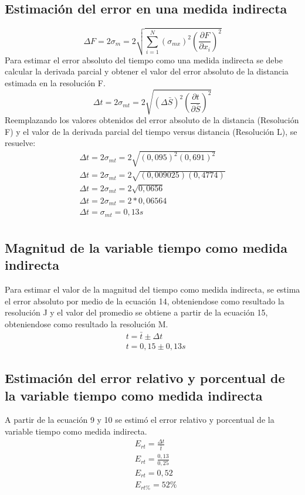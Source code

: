 \documentclass[runningheads]{llncs}
\begin{document}
    \subsection{Estimación del error en una medida indirecta}
    \begin{equation}
        \Delta F=2\sigma_{m}=2{\sqrt{{\displaystyle\sum_{i=1}^{N}(\sigma_{mx})^{2} (\frac{\partial F}{\partial x_{i}})^{2}}}}
    \end{equation}
    Para estimar el error absoluto del tiempo como una medida indirecta se debe calcular la derivada parcial y obtener el valor del error absoluto de la distancia estimada en la resolución F.
    \begin{equation}
        \Delta t=2\sigma_{mt}=2{\sqrt{(\Delta \bar{S})^{2} (\frac{\partial t}{\partial \bar{S}})^{2}}}
    \end{equation}
    Reemplazando los valores obtenidos del error absoluto de la distancia (Resolución F) y el valor de la derivada parcial del tiempo versus distancia (Resolución L), se resuelve:
    \begin{align*}
        \Delta t=2\sigma_{mt}=2{\sqrt{(0,095)^{2} (0,691)^{2}}}\\
        \Delta t=2\sigma_{mt}=2{\sqrt{(0,009025) (0,4774)}}\\
        \Delta t=2\sigma_{mt}=2{\sqrt{0,0656}}\\
        \Delta t=2\sigma_{mt}=2*0,06564\\
        \Delta t=\sigma_{mt}=0,13s\tag{J}\\
    \end{align*}
    \subsection{Magnitud de la variable tiempo como medida indirecta}
    Para estimar el valor de la magnitud del tiempo como medida indirecta, se estima el error absoluto por medio de la ecuación 14, obteniendose como resultado la resolución J y el valor del promedio se obtiene a partir de la
    ecuación 15, obteniendose como resultado la resolución M.
    \begin{align*}
        &t=\bar{t}\pm \Delta t\\
        &t=0,15 \pm0,13 s
    \end{align*} 
    \subsection{Estimación del error relativo y porcentual de la variable tiempo como medida indirecta}
    A partir de la ecuación 9 y 10 se estimó el error relativo y porcentual de la variable tiempo como medida indirecta. 
    \begin{align*}
        &E_{rt}=\frac{\Delta t}{\bar{t}}\\
        &E_{rt}=\frac{0,13}{0,25}\\
        &E_{rt}=0,52 \tag{K}\\
        &E_{rt\%}=52\% \tag{L}
    \end{align*}
\end{document}

